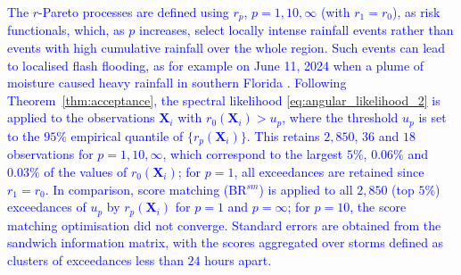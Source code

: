 \documentclass[12pt]{article}
\newcommand{\PZ}{\textcolor{blue}}
\begin{document}
%
\PZ{The $r$-Pareto processes are defined using $r_p$, $p=1,10,\infty$ (with $r_1=r_0$), as risk functionals, which, as $p$ increases, select locally intense rainfall events rather than events with high cumulative rainfall over the whole region. Such events can lead to localised flash flooding, as for example on June 11, 2024 when a plume of moisture caused heavy rainfall in southern Florida \citep{doermann2024rainfall}.}
%
\PZ{Following Theorem~\ref{thm:acceptance}, the spectral likelihood \eqref{eq:angular_likelihood_2} is applied to the observations $\bm X_i$ with $r_0(\bm X_i)>u_p$, where the threshold $u_p$ is set to the $95\%$ empirical quantile of $\{r_p(\bm X_i)\}$. This retains $2{,}850$, $36$ and $18$ observations for $p=1,10,\infty$, which correspond to the largest $5\%$, $0.06\%$ and $0.03\%$ of the values of $r_0(\bm X_i)$; for $p=1$, all exceedances are retained since $r_1=r_0$. In comparison, score matching (BR$^{sm}$) is applied to all $2{,}850$ (top $5\%$) exceedances of $u_p$ by $r_p(\bm X_i)$ for $p=1$ and $p=\infty$; for $p=10$, the score matching optimisation did not converge. Standard errors are obtained from the sandwich information matrix, with the scores aggregated over storms defined as clusters of exceedances less than $24$ hours apart.}
%
% 
\end{document}
